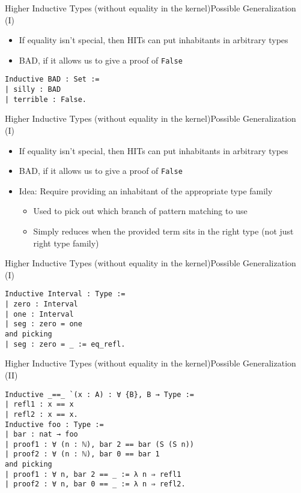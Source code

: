 \documentclass{beamer}
\begin{document}
\begin{frame}[fragile]{Higher Inductive Types (without equality in the kernel)}{Possible Generalization (I)}
  \Large
  \begin{itemize}
    \item If equality isn't special, then HITs can put inhabitants in arbitrary types
    \item BAD, if it allows us to give a proof of \texttt{False}
  \end{itemize}
\begin{verbatim}
Inductive BAD : Set :=
| silly : BAD
| terrible : False.
\end{verbatim}
\end{frame}

\begin{frame}{Higher Inductive Types (without equality in the kernel)}{Possible Generalization (I)}
  \Large
  \begin{itemize}
    \item If equality isn't special, then HITs can put inhabitants in arbitrary types
    \item BAD, if it allows us to give a proof of \texttt{False}
    \item Idea: Require providing an inhabitant of the appropriate type family \pause
      \begin{itemize} \large
        \item Used to pick out which branch of pattern matching to use \pause
        \item Simply reduces when the provided term sits in the right type (not just right type family)
      \end{itemize}
  \end{itemize}
\end{frame}

\begin{frame}[fragile]{Higher Inductive Types (without equality in the kernel)}{Possible Generalization (I)}
  \Large
\begin{verbatim}
Inductive Interval : Type :=
| zero : Interval
| one : Interval
| seg : zero = one
and picking
| seg : zero = _ := eq_refl.
\end{verbatim}
\end{frame}

\begin{frame}[fragile]{Higher Inductive Types (without equality in the kernel)}{Possible Generalization (II)}
  \Large
\begin{verbatim}
Inductive _==_ `(x : A) : ∀ {B}, B → Type :=
| refl1 : x == x
| refl2 : x == x.
Inductive foo : Type :=
| bar : nat → foo
| proof1 : ∀ (n : ℕ), bar 2 == bar (S (S n))
| proof2 : ∀ (n : ℕ), bar 0 == bar 1
and picking
| proof1 : ∀ n, bar 2 == _ := λ n ⇒ refl1
| proof2 : ∀ n, bar 0 == _ := λ n ⇒ refl2.
\end{verbatim}
\end{frame}
\end{document}
